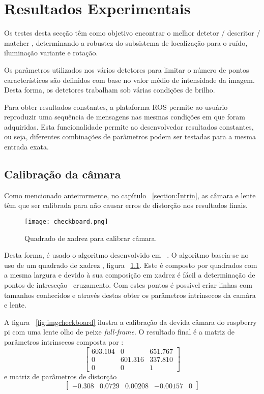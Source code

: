 \chapter{Resultados Experimentais} \label{chap:resexp}


Os testes desta secção têm como objetivo encontrar o melhor detetor / descritor / matcher , determinando a robustez do subsistema de localização para o ruído, iluminação variante e rotação.

Os parâmetros utilizados nos vários detetores para limitar o número de pontos característicos são definidos com base no valor médio de intensidade da imagem. Desta forma, os detetores trabalham sob várias condições de brilho.

Para obter resultados constantes, a plataforma ROS permite ao usuário reproduzir uma sequência de mensagens nas mesmas condições em que foram adquiridas. Esta funcionalidade permite ao desenvolvedor resultados constantes, ou seja, diferentes combinações de parâmetros podem ser testadas para a mesma entrada exata.

\section{Calibração da câmara}

Como mencionado anteirormente, no capítulo ~\ref{section:Intrin}, as câmara e lente têm que ser calibrada para não causar erros de distorção nos resultados finais. 

\begin{figure}[h!]  %
	\centering
	\texttt{[image: checkboard.png]} 
	\caption{Quadrado de xadrez para calibrar câmara.}
	\label{fig:checkboard}  %
\end{figure}

Desta forma, é usado o algoritmo desenvolvido em ~\cite{piCam}. O algoritmo baseia-se no uso de um quadrado de xadrez , figura ~\ref{fig:checkboard}. Este é composto por quadrados com a mesma largura e devido à sua composição em xadrez é fácil a determinação de pontos de intreseção \ cruzamento. Com estes pontos é possivel criar linhas com tamanhos conhecidos e através destas obter os parâmetros intrinsecos da camâra e lente. 



A figura ~\ref{fig:imgcheckboard} ilustra a calibração da devida câmara do raspberry pi com uma lente olho de peixe \textit{full-frame}. O resultado final é a matriz de parâmetros intrinsecos composta por : \[ \left[ \begin{array}{ccc}
603.104 & 0 & 651.767 \\ 
0 & 601.316 & 337.810 \\ 
0 & 0 & 1
\end{array} \right] \] e matriz de parâmetros de distorção \[ \left[\begin{array}{ccccc}
-0.308 & 0.0729 & 0.00208 & -0.00157 & 0 
\end{array} \right] \]

